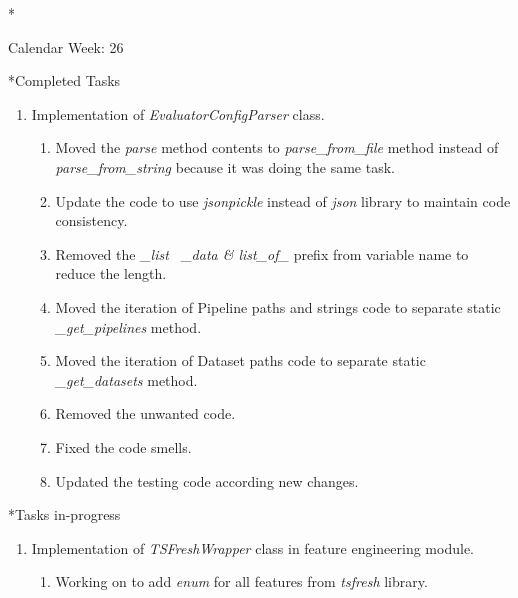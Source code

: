 \documentclass[11pt,a4paper]{article}
\begin{document}
\newpage
\begin{section}*{Calendar Week: 26 \hfill \date{02 July, 2021}}
 \begin{subsection}*{Completed Tasks}
     \begin{enumerate}
         \item Implementation of \textit{EvaluatorConfigParser} class.
               \begin{enumerate}
                   \item Moved the \textit{parse} method contents to \textit{parse\_from\_file} method instead of \textit{parse\_from\_string} because it was doing the same task.
                   \item Update the code to use \textit{jsonpickle} instead of \textit{json} library to maintain code consistency.
                   \item Removed the \textit{\_list \, \_data \& list\_of\_} prefix from variable name to reduce the length.
                   \item Moved the iteration of Pipeline paths and strings code to separate static \textit{\_get\_pipelines} method.
                   \item Moved the iteration of Dataset paths code to separate static \textit{\_get\_datasets} method.
                   \item Removed the unwanted code.
                   \item Fixed the code smells.
                   \item Updated the testing code according new changes.
               \end{enumerate}
     \end{enumerate}
 \end{subsection}
 \begin{subsection}*{Tasks in-progress}
     \begin{enumerate}
         \item Implementation of \textit{TSFreshWrapper} class in feature engineering module.
               \begin{enumerate}
                   \item Working on to add \textit{enum} for all features from \textit{tsfresh} library.
               \end{enumerate}
     \end{enumerate}
 \end{subsection}
\end{section}
\end{document}
